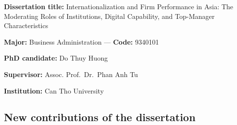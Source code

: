 \documentclass[
  a4paper,
  13pt]{extarticle}
\begin{document}
\textbf{Dissertation title:} Internationalization and Firm Performance
in Asia: The Moderating Roles of Institutions, Digital Capability, and
Top-Manager Characteristics

\textbf{Major:} Business Administration --- \textbf{Code:} 9340101

\textbf{PhD candidate:} Do Thuy Huong

\textbf{Supervisor:} Assoc. Prof.~Dr.~Phan Anh Tu

\textbf{Institution:} Can Tho University

\hypertarget{new-contributions-of-the-dissertation}{%
\subsection*{New contributions of the
dissertation}\label{new-contributions-of-the-dissertation}}
\end{document}
